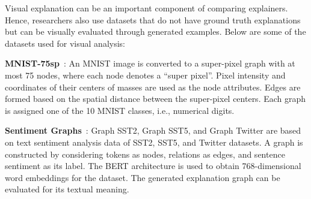 Visual explanation can be an important component of comparing explainers. Hence, researchers also use datasets that do not have ground truth explanations but can be visually evaluated through generated examples. Below are some of the datasets used for visual analysis:

\noindent\textbf{MNIST-75sp}~\cite{mnist_75}: An MNIST image is converted to a super-pixel graph with at most 75 nodes, where each node denotes a ``super pixel''. Pixel intensity and coordinates of their centers of masses are used as the node attributes. Edges are formed based on the spatial distance between the super-pixel centers. Each graph is assigned one of the 10 MNIST classes, i.e., numerical digits. 

\noindent\textbf{Sentiment Graphs}~\cite{sst-datasets}: Graph SST2, Graph SST5, and Graph Twitter are based on text sentiment analysis data of SST2, SST5, and Twitter datasets. A graph is constructed by considering tokens as nodes, relations as edges, and sentence sentiment as its label. The BERT architecture is used to obtain 768-dimensional word embeddings for the dataset. The generated explanation graph can be evaluated for its textual meaning. 




